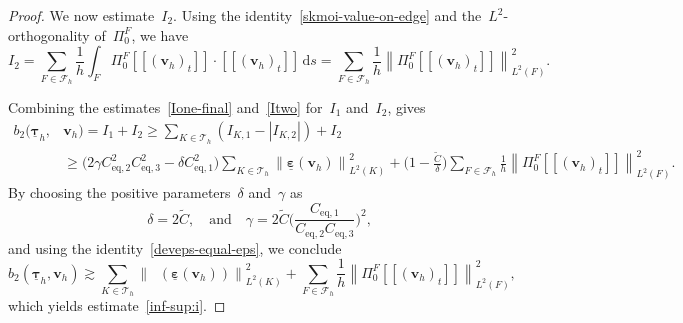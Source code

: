 \documentclass[10pt,a4paper]{amsart}
\newcommand{\Ceqone}{C_{\text{eq},1}}
\newcommand{\Ceqthree}{C_{\text{eq},3}}
\newcommand{\Ceqtwo}{C_{\text{eq},2}}
\newcommand{\Ctilde}{\widetilde{C}}
\newcommand{\F}{F}
\newcommand{\Fcalh}{\mathcal{F}_h}
\newcommand{\IKone}{I_{\K,1}}
\newcommand{\IKtwo}{I_{\K,2}}
\newcommand{\Ione}{I_1}
\newcommand{\Itwo}{I_2}
\newcommand{\K}{K}
\newcommand{\Ltwo}{L^2}
\newcommand{\Norm}[1]{{\left\|{#1} \right\|}}
\newcommand{\PizF}{\Pi_0^{\F}}
\newcommand{\Tauh}{\mathcal{T}_h}
\newcommand{\btwo}{b_2}
\DeclareMathOperator{\dev}{\underline{\mathbf{dev}}}
\newcommand{\ds}{\, \mathrm{d}s}
\newcommand{\epsbfun}{\underline{\boldsymbol{\varepsilon}}}
\newcommand{\jump}[1]{\left[\!\left[#1\right]\!\right]}
\newcommand{\tangscalar}{t}
\newcommand{\taubfh}{\underline{\boldsymbol{\tau}}_h}
\newcommand{\vbfh}{\mathbf{v}_h}
\begin{document}
\begin{proof}
We now estimate~$\Itwo$.
Using the identity~\eqref{skmoi-value-on-edge}
and the~$\Ltwo$-orthogonality of~$\PizF$,
we have
\begin{equation} \label{Itwo}
\Itwo 
= \sum_{\F \in \Fcalh} \frac{1}{h}\int_\F \PizF\jump{(\vbfh)_{\tangscalar}} 
  \cdot \jump{(\vbfh)_{\tangscalar}} \ds
= \sum_{\F \in \Fcalh} \frac{1}{h}
  \Norm{\PizF\jump{(\vbfh)_{\tangscalar}}}_{\Ltwo(\F)}^2.
\end{equation}

Combining the estimates~\eqref{Ione-final} and~\eqref{Itwo}
for~$\Ione$ and~$\Itwo$,
gives
\begin{equation*}
\begin{split}
\btwo(\taubfh,&\vbfh)
= \Ione + \Itwo \geq \sum_{\K\in\Tauh}(\IKone - |\IKtwo|) + \Itwo \\
&\geq \Big(2\gamma\Ceqtwo^2\Ceqthree^2-\delta\Ceqone^2\Big)\sum_{\K \in \Tauh}\Norm{\epsbfun(\vbfh)}_{\Ltwo(\K)}^2
  + \Big(1 - \frac{\Ctilde}{\delta}\Big)
  \sum_{\F \in \Fcalh}
  \frac{1}{h}\Norm{\PizF\jump{(\vbfh)_{\tangscalar}}}_{\Ltwo(\F)}^2.
\end{split}
\end{equation*}
By choosing the positive parameters~$\delta$ and~$\gamma$ as
\begin{equation} \label{delta-gamma}
\delta = 2\Ctilde,
\quad \text{and}\quad
\gamma = 2\Ctilde\Big(\frac{\Ceqone}{\Ceqtwo\Ceqthree}\Big)^2,
\end{equation}
and using the identity~\eqref{deveps-equal-eps},
we conclude
\begin{equation*}
\btwo(\taubfh,\vbfh)
\gtrsim  \sum_{\K \in \Tauh} \Norm{\dev(\epsbfun(\vbfh))}_{\Ltwo(\K)}^2
  + \sum_{\F \in \Fcalh}
  \frac{1}{h}\Norm{\PizF\jump{(\vbfh)_{\tangscalar}}}_{\Ltwo(\F)}^2,
\end{equation*}
which yields estimate~\eqref{inf-sup:i}.


\end{proof}
\end{document}

